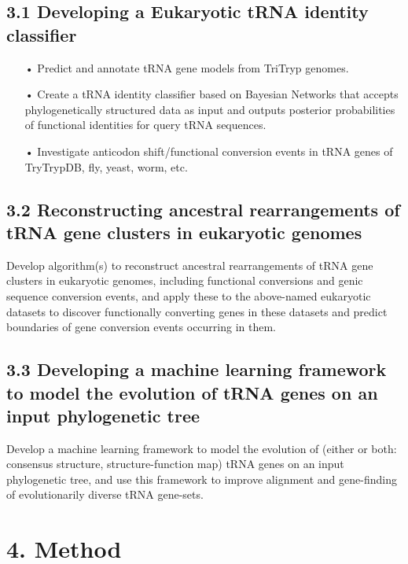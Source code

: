 \documentclass[
12pt, %
a4paper, %
oneside, %
headinclude,footinclude, %
BCOR5mm, %
]{scrartcl}
\begin{document}
\subsection{\textbf{3.1 Developing a Eukaryotic tRNA identity classifier}}
 
\begin{enumerate}[noitemsep] %
\item[•] Predict and annotate tRNA gene models from TriTryp genomes. %
\item[•] Create a tRNA identity classifier based on Bayesian Networks that accepts phylogenetically structured data as input and outputs posterior probabilities of functional identities for query tRNA sequences.
\item[•] Investigate anticodon shift/functional conversion events in tRNA genes of TryTrypDB, fly, yeast, worm, etc. 

\end{enumerate} 
\subsection{\textbf{3.2 Reconstructing ancestral rearrangements of tRNA gene clusters in eukaryotic genomes}}
Develop algorithm(s) to reconstruct ancestral rearrangements of tRNA gene clusters in eukaryotic genomes, including functional conversions and genic sequence conversion events, and apply these to the above-named eukaryotic datasets to discover functionally converting genes in these datasets and predict boundaries of gene conversion events occurring in them.  
\subsection{\textbf{3.3 Developing a machine learning framework to model the evolution of tRNA genes on an input phylogenetic tree}}
Develop a machine learning framework to model the evolution of (either or both: {consensus structure, structure-function map}) tRNA genes on an input phylogenetic tree, and use this framework to improve alignment and gene-finding of evolutionarily diverse tRNA gene-sets.
\section{4. Method}
\end{document}
